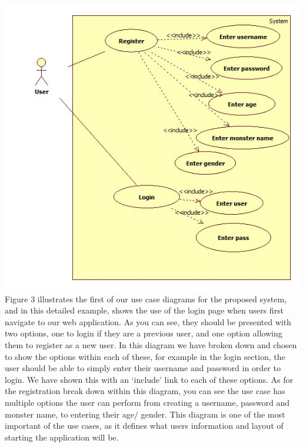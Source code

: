 \documentclass[a4paper]{article}
\begin{document}
\begin{center}
\includegraphics[width=\textwidth]{img/UseCaseHome.jpg}
Figure 3 illustrates the first of our use case diagrams for the proposed system, and in this detailed example, shows the use of the login page when users first navigate to our web application. As you can see, they should be presented with two options, one to login if they are a previous user, and one option allowing them to register as a new user. In this diagram we have broken down and chosen to show the options within each of these, for example in the login section, the user should be able to simply enter their username and password in order to login. We have shown this with an ‘include’ link to each of these options. As for the registration break down within this diagram, you can see the use case has multiple options the user can perform from creating a username, password and monster name, to entering their age/ gender. This diagram is one of the most important of the use cases, as it defines what users information and layout of starting the application will be.


\end{center}
\end{document}
